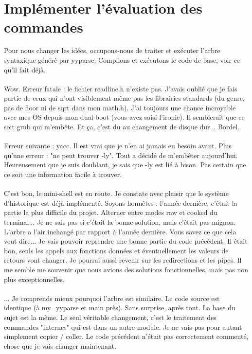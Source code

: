 \chapter[Évaluation]{Implémenter l'évaluation des commandes}
Pour nous changer les idées, occupons-nous de traiter et exécuter l'arbre syntaxique généré par yyparse. Compilons et exécutons le code de base, voir ce qu'il fait déjà.
\\\\
Wow. Erreur fatale : le fichier readline.h n'existe pas. J'avais oublié que je fais partie de ceux qui n'ont visiblement même pas les librairies standards (du genre, pas de floor ni de sqrt dans mon math.h). J'ai toujours une chance incroyable avec mes OS depuis mon dual-boot (vous avez saisi l'ironie). Il semblerait que ce soit grub qui m'embête. Et ça, c'est du au changement de disque dur... Bordel.
\\\\
Erreur suivante : yacc. Il est vrai que je n'en ai jamais eu besoin avant. Plus qu'une erreur : "ne peut trouver -ly". Tout a décidé de m'embêter aujourd'hui. Heureusement que je suis doublant, je sais que -ly est lié à bison. Pas certain que ce soit une information facile à trouver.
\\\\
C'est bon, le mini-shell est en route. Je constate avec plaisir que le système d'historique est déjà implémenté. Soyons honnêtes : l'année dernière, c'était la partie la plus difficile du projet. Alterner entre modes raw et cooked du terminal... Je ne sais pas si c'était la bonne solution, mais c'était pas mignon. L'arbre a l'air inchangé par rapport à l'année dernière. Vous savez ce que cela veut dire... Je vais pouvoir reprendre une bonne partie du code précédent. Il était bon, seuls les appels aux fonctions données et éventuellement les valeurs de retours vont changer. Je pourrai aussi revenir sur les redirections et les pipes. Il me semble me souvenir que nous avions des solutions fonctionnelles, mais pas non plus exceptionnelles.
\\\\
... Je comprends mieux pourquoi l'arbre est similaire. Le code source est identique (à my\_yyparse et main près). Sans surprise, après tout. La base du sujet est la même. Le seul véritable changement, c'est le traitement des commandes "internes" qui est dans un autre module. Je ne vais pas pour autant simplement copier / coller. Le code précédent n'était pas correctement commenté, chose que je vais changer maintenant.
\\\\
